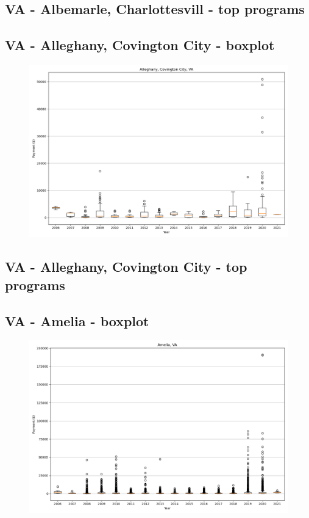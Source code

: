 \subsection*{VA - Albemarle, Charlottesvill - top programs}

\newpage
\subsection*{VA - Alleghany, Covington City - boxplot}
\begin{figure}[h]
\centering
\includegraphics[width=7in]{../output/boxplots/counties/Alleghany, Covington City-VA_boxplot.png}
\end{figure}


\subsection*{VA - Alleghany, Covington City - top programs}

\newpage
\subsection*{VA - Amelia - boxplot}
\begin{figure}[h]
\centering
\includegraphics[width=7in]{../output/boxplots/counties/Amelia-VA_boxplot.png}
\end{figure}


